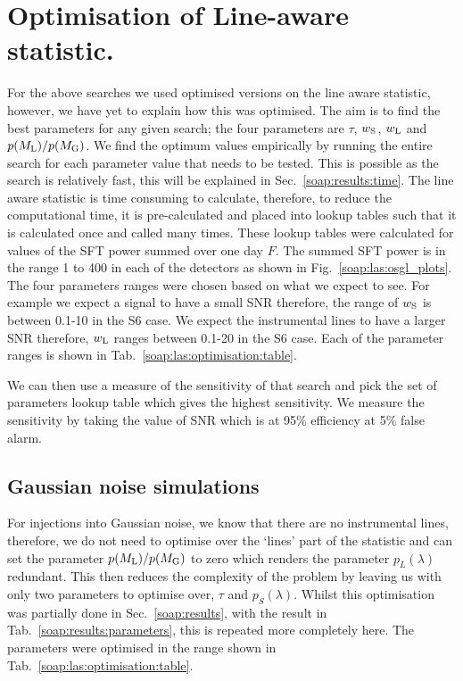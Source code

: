 \section{\label{soap:las:optimisation}Optimisation of Line-aware statistic.}

For the above searches we used optimised versions on the line aware statistic,
however, we have yet to explain how this was optimised.  The aim is to find the
best parameters for any given search; the four parameters are
$\tau$, $w_{\rm{S}}$, $w_{\rm{L}}$ and $p(M_{\rm{L}})/p(M_{\rm{G}})$.  We find
the optimum values empirically by running the entire search for each parameter
value that needs to be tested. This is possible as the search is relatively
fast, this will be explained in Sec.~\ref{soap:results:time}.  The line aware
statistic is time consuming to calculate, therefore, to reduce the
computational time, it is pre-calculated and placed into lookup tables such
that it is calculated once and called many times.  These lookup tables were
calculated for values of the \gls{SFT} power summed over one day $F$. The summed \gls{SFT} power is in the range 1 to 400 in each of the detectors as shown in Fig.~\ref{soap:las:osgl_plots}.
The four parameters ranges were chosen based on what we expect to see.
For example we expect a signal to have a small \gls{SNR} therefore, the range of $w_{\rm{S}}$ is between 0.1-10 in the S6 case.
We expect the instrumental lines to have a larger \gls{SNR} therefore, $w_{\rm{L}}$ ranges between 0.1-20 in the S6 case. Each of the parameter ranges is shown in Tab.~\ref{soap:las:optimisation:table}.

We can then use a measure of the sensitivity of that search and pick the set of parameters lookup
table which gives the highest sensitivity. 
We measure the sensitivity by taking the value of \gls{SNR} which is at 95\% efficiency at 5\% false alarm. 

\subsection{\label{soap:las:optimisation:gauss}Gaussian noise simulations}

For injections into Gaussian noise, we know that there are no instrumental
lines, therefore, we do not need to optimise over the `lines' part of the
statistic and can set the parameter $p(M_{\rm{L}})/p(M_{\rm{G}})$ to zero which renders the
parameter $p_L(\lambda)$ redundant. 
This then reduces the complexity of the problem by leaving us with only two parameters to optimise over, $\tau$ and $p_S(\lambda)$. 
Whilst this optimisation was partially done in Sec.~\ref{soap:results}, with the result in Tab.~\ref{soap:results:parameters}, this is repeated more completely here.
The parameters were optimised in the range shown in Tab.~\ref{soap:las:optimisation:table}. 

